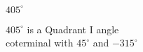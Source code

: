 {$405^{\circ}$}
{ $405^{\circ}$ is a Quadrant I angle\\
coterminal with $45^{\circ}$ and $-315^{\circ}$

\begin{center}
\end{center}}